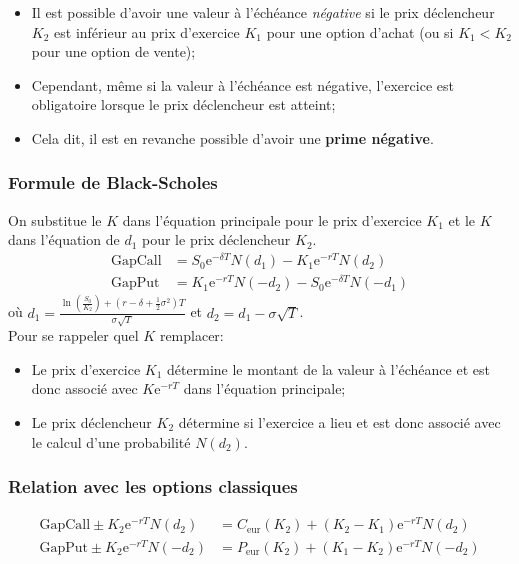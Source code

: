 \documentclass[10pt, french]{article}
\begin{document}
\begin{multicols*}{2}
\begin{definitionNOHFILLsub}[]
\begin{center}
\begin{tikzpicture}[x=0.75pt,y=0.75pt,yscale=-1,xscale=1]
\end{tikzpicture}
\end{center}
\end{definitionNOHFILLsub}

\begin{itemize}[leftmargin = *]
	\item	Il est possible d'avoir une valeur à l'échéance \textit{négative} si le prix déclencheur $K_{2}$ est inférieur au prix  d'exercice $K_{1}$ pour une option d'achat (ou si $K_{1} < K_{2}$ pour une option de vente);
	\item	Cependant, même si la valeur à l'échéance est négative, l'exercice est obligatoire lorsque le prix déclencheur est atteint;
	\item	Cela dit, il est en revanche possible d'avoir une \textbf{prime négative}.
\end{itemize}

\subsubsection*{Formule de Black-Scholes}
On substitue le $K$ dans l'équation principale pour le prix d'exercice $K_{1}$ et le $K$ dans l'équation de $d_{1}$ pour le prix déclencheur $K_{2}$.
\begin{align*}
	\text{GapCall}
	&=	S_{0} \textrm{e}^{- \delta T} N(d_{1}) - K_{1}\textrm{e}^{-rT} N(d_{2})	\\
	\text{GapPut}
	&=	K_{1}\textrm{e}^{-rT} N(-d_{2}) - S_{0}\textrm{e}^{-\delta T}N(-d_{1})	
\end{align*}
où $d_{1}	=	\frac{\ln\left(\frac{S_{0}}{K_{2}}\right) + \left( r - \delta + \frac{1}{2} \sigma^{2} \right)T}{\sigma \sqrt{T}}$ et $d_{2}	=	d_{1} - \sigma \sqrt{T}$.\\

Pour se rappeler quel $K$ remplacer:
\begin{itemize}[leftmargin = *]
	\item	Le prix d'exercice $K_{1}$ détermine le montant de la valeur à l'échéance et est donc associé avec $K\textrm{e}^{-rT}$ dans l'équation principale;
	\item	Le prix déclencheur $K_{2}$ détermine si l'exercice a lieu et est donc associé avec le calcul d'une probabilité $N(d_{2})$.
\end{itemize}

\subsubsection*{Relation avec les options classiques}
\begin{align*}
	\text{GapCall}	\pm	K_{2}\textrm{e}^{-rT} N(d_{2})
	&=	C_{\text{eur}}(K_{2})	+	(K_{2}	-	K_{1})\textrm{e}^{-rT} N(d_{2})	\\
	\text{GapPut}	\pm	K_{2}\textrm{e}^{-rT} N(-d_{2})
	&=	P_{\text{eur}}(K_{2})	+	(K_{1}	-	K_{2})\textrm{e}^{-rT} N(-d_{2})
\end{align*}


\end{multicols*}
\end{document}
